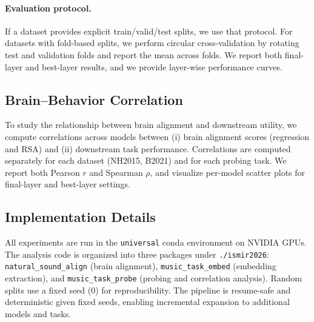 \paragraph{Evaluation protocol.}
If a dataset provides explicit train/valid/test splits, we use that protocol. For datasets with fold-based splits, we perform circular cross-validation by rotating test and validation folds and report the mean across folds. We report both final-layer and best-layer results, and we provide layer-wise performance curves.

\subsection{Brain--Behavior Correlation}
To study the relationship between brain alignment and downstream utility, we compute correlations across models between (i) brain alignment scores (regression and RSA) and (ii) downstream task performance. Correlations are computed separately for each dataset (NH2015, B2021) and for each probing task. We report both Pearson $r$ and Spearman $\rho$, and visualize per-model scatter plots for final-layer and best-layer settings.

\subsection{Implementation Details}
All experiments are run in the \texttt{universal} conda environment on NVIDIA GPUs. The analysis code is organized into three packages under \texttt{./ismir2026}: \texttt{natural\_sound\_align} (brain alignment), \texttt{music\_task\_embed} (embedding extraction), and \texttt{music\_task\_probe} (probing and correlation analysis). Random splits use a fixed seed (0) for reproducibility. The pipeline is resume-safe and deterministic given fixed seeds, enabling incremental expansion to additional models and tasks.

